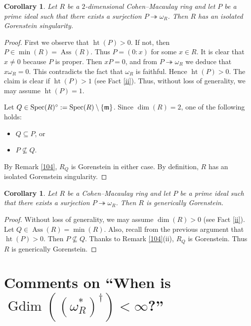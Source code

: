 \documentclass[10. pt,a4paper]{amsart}
\newtheorem{corollary}[theorem]{Corollary}
\theoremstyle{definition}
\theoremstyle{remark}
\newcommand{\Ass}{\operatorname{Ass}}
\newcommand{\Spec}{\operatorname{Spec}}
\newcommand{\fm}{\frak{m}}
\begin{document}
\begin{corollary}\label{105}
	Let $R$ be a $2$-dimensional Cohen--Macaulay ring and let $P$ be a prime ideal such that there exists a surjection $P \twoheadrightarrow \omega_R$. Then $R$ has an isolated Gorenstein singularity.
\end{corollary}

\begin{proof}
	First we observe that $\operatorname{ht}(P) > 0$. If not, then $P \in \min(R) = \Ass(R)$. Thus $P = (0 : x)$ for some $x \in R$. It is clear that $x \neq 0$ because $P$ is proper. Then $xP = 0$, and from $P \twoheadrightarrow \omega_R$ we deduce that $x \omega_R = 0$. This contradicts the fact that $\omega_R$ is faithful. Hence $\operatorname{ht}(P) > 0$. The claim is clear if $\operatorname{ht}(P) > 1$ (see Fact \ref{ii}). Thus, without loss of generality, we may assume $\operatorname{ht}(P) = 1$.
	
	Let $Q \in \Spec(R)^\circ := \Spec(R) \setminus \{\fm\}$. Since $\dim(R) = 2$, one of the following holds:
	\begin{itemize}
		\item[(i)] $Q \subseteq P$, or
		\item[(ii)] $P \nsubseteq Q$.
	\end{itemize}
	By Remark \ref{104}, $R_Q$ is Gorenstein in either case. By definition, $R$ has an isolated Gorenstein singularity.
\end{proof}

\begin{corollary}\label{106}
	Let $R$ be a Cohen--Macaulay ring and let $P$ be a prime ideal such that there exists a surjection $P \twoheadrightarrow \omega_R$. Then $R$ is generically Gorenstein.
\end{corollary}

\begin{proof}
	Without loss of generality, we may assume $\dim(R) > 0$ (see Fact \ref{ii}). Let $Q \in \Ass(R) = \min(R)$. Also, recall from the previous argument that $\operatorname{ht}(P) > 0$. Then $P \nsubseteq Q$. Thanks to Remark \ref{104}(ii), $R_Q$ is Gorenstein. Thus $R$ is generically Gorenstein.
\end{proof}

\medskip
\section{Comments on ``When is $\operatorname{Gdim}((\omega_R^\ast)^\dagger) < \infty$?''}
\end{document}
